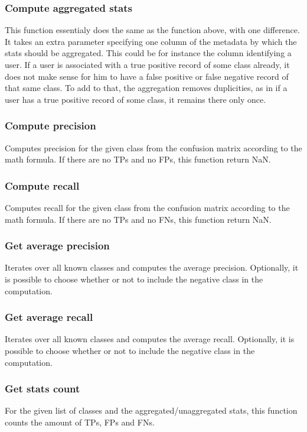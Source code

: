 \documentclass[11pt]{article}
\begin{document}
      \subsubsection{Compute aggregated stats}
        This function essentialy does the same as the function above, with one difference. It takes an extra parameter specifying one column of the metadata by which the stats should be aggregated. This could be for instance the column identifying a user. If a user is associated with a true positive record of some class already, it does not make sense for him to have a false positive or false negative record of that same class. To add to that, the aggregation removes duplicities, as in if a user has a true positive record of some class, it remains there only once.
      \subsubsection{Compute precision}
        Computes precision for the given class from the confusion matrix according to the math formula. If there are no TPs and no FPs, this function return NaN.
      \subsubsection{Compute recall}
        Computes recall for the given class from the confusion matrix according to the math formula. If there are no TPs and no FNs, this function return NaN.
      \subsubsection{Get average precision}
        Iterates over all known classes and computes the average precision. Optionally, it is possible to choose whether or not to include the negative class in the computation.
      \subsubsection{Get average recall}
        Iterates over all known classes and computes the average recall. Optionally, it is possible to choose whether or not to include the negative class in the computation.
      \subsubsection{Get stats count}
        For the given list of classes and the aggregated/unaggregated stats, this function counts the amount of TPs, FPs and FNs.
  \newpage
\end{document}
